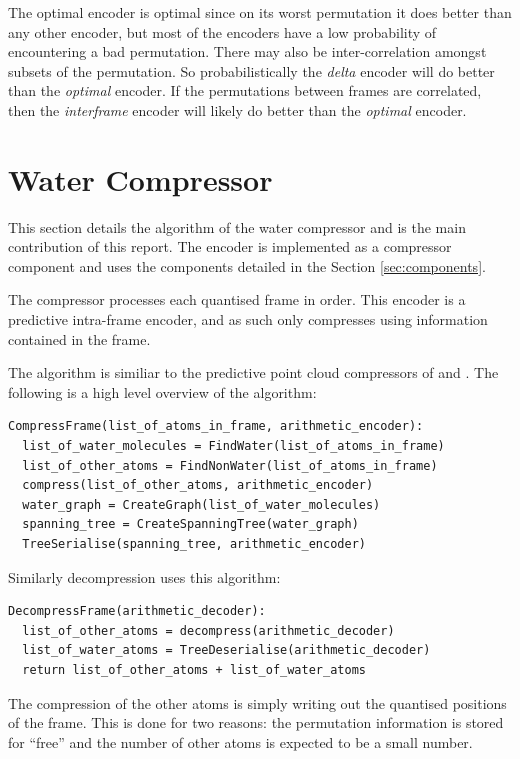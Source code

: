 \documentclass[a4paper]{report}
\begin{document}
The optimal encoder is optimal since on its worst permutation it does better
than any other encoder, but most of the encoders have a low probability of
encountering a bad permutation. There may also be inter-correlation amongst
subsets of the permutation. So probabilistically the \emph{delta} encoder will
do better than the \emph{optimal} encoder. If the permutations between frames
are correlated, then the \emph{interframe} encoder will likely do better than
the \emph{optimal} encoder.


\section{Water Compressor}

This section details the algorithm of the water compressor and is the main
contribution of this report. The encoder is implemented as a compressor
component and uses the components detailed in the Section
\ref{sec:components}.

The compressor processes each quantised frame in order. This encoder is a
predictive intra-frame encoder, and as such only compresses using information
contained in the frame.

The algorithm is similiar to the predictive point cloud compressors of
\citep{gumholdcomp} and \citep{merrycomp}. The following is a high level
overview of the algorithm:

\begin{verbatim}
CompressFrame(list_of_atoms_in_frame, arithmetic_encoder):
  list_of_water_molecules = FindWater(list_of_atoms_in_frame)
  list_of_other_atoms = FindNonWater(list_of_atoms_in_frame)
  compress(list_of_other_atoms, arithmetic_encoder)
  water_graph = CreateGraph(list_of_water_molecules)
  spanning_tree = CreateSpanningTree(water_graph)
  TreeSerialise(spanning_tree, arithmetic_encoder)
\end{verbatim}

\noindent Similarly decompression uses this algorithm:

\begin{verbatim}
DecompressFrame(arithmetic_decoder):
  list_of_other_atoms = decompress(arithmetic_decoder)
  list_of_water_atoms = TreeDeserialise(arithmetic_decoder)
  return list_of_other_atoms + list_of_water_atoms
\end{verbatim}

The compression of the other atoms is simply writing out the quantised
positions of the frame. This is done for two reasons: the permutation
information is stored for ``free'' and the number of other atoms is expected
to be a small number.
\end{document}
